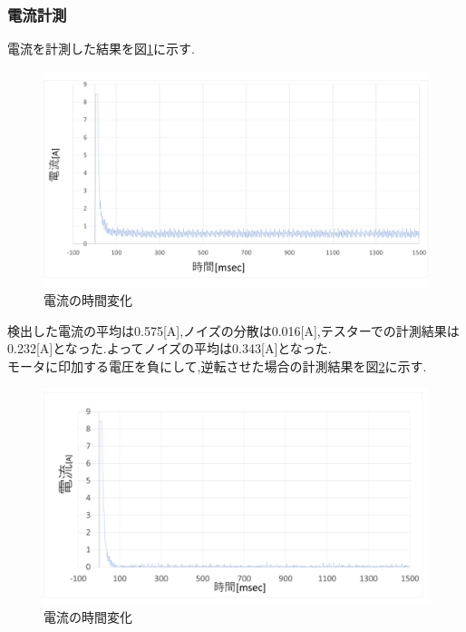 \subsubsection{電流計測}
電流を計測した結果を図\ref{fig:currentMeasurement}に示す.

\begin{figure}[H]
 \begin{center}
    \includegraphics[width=150mm]{img/currentMeasurement.png}
    \end{center}
  \caption{電流の時間変化}
 \label{fig:currentMeasurement}
\end{figure}

検出した電流の平均は0.575[A],ノイズの分散は0.016[A],テスターでの計測結果は0.232[A]となった.よってノイズの平均は0.343[A]となった.
\\
モータに印加する電圧を負にして,逆転させた場合の計測結果を図\ref{fig:currentMeasurement2}に示す.

\begin{figure}[H]
 \begin{center}
    \includegraphics[width=150mm]{img/currentMeasurement2.png}
    \end{center}
  \caption{電流の時間変化}
 \label{fig:currentMeasurement2}
\end{figure}

